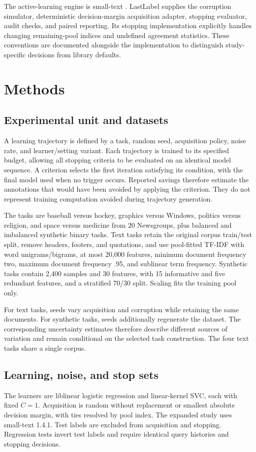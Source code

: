 \documentclass[10pt,twocolumn]{article}
\begin{document}
The active-learning engine is small-text \cite{smalltext}. LastLabel supplies the corruption simulator, deterministic decision-margin acquisition adapter, stopping evaluator, audit checks, and paired reporting. Its stopping implementation explicitly handles changing remaining-pool indices and undefined agreement statistics. These conventions are documented alongside the implementation to distinguish study-specific decisions from library defaults.

\section{Methods}
\subsection{Experimental unit and datasets}
A learning trajectory is defined by a task, random seed, acquisition policy, noise rate, and learner/setting variant. Each trajectory is trained to its specified budget, allowing all stopping criteria to be evaluated on an identical model sequence. A criterion selects the first iteration satisfying its condition, with the final model used when no trigger occurs. Reported savings therefore estimate the annotations that would have been avoided by applying the criterion. They do not represent training computation avoided during trajectory generation.

The tasks are baseball versus hockey, graphics versus Windows, politics versus religion, and space versus medicine from 20 Newsgroups, plus balanced and imbalanced synthetic binary tasks. Text tasks retain the original corpus train/test split, remove headers, footers, and quotations, and use pool-fitted TF-IDF with word unigrams/bigrams, at most 20,000 features, minimum document frequency two, maximum document frequency .95, and sublinear term frequency. Synthetic tasks contain 2,400 samples and 30 features, with 15 informative and five redundant features, and a stratified 70/30 split. Scaling fits the training pool only.

For text tasks, seeds vary acquisition and corruption while retaining the same documents. For synthetic tasks, seeds additionally regenerate the dataset. The corresponding uncertainty estimates therefore describe different sources of variation and remain conditional on the selected task construction. The four text tasks share a single corpus.

\subsection{Learning, noise, and stop sets}
The learners are liblinear logistic regression and linear-kernel SVC, each with fixed $C=1$. Acquisition is random without replacement or smallest absolute decision margin, with ties resolved by pool index. The expanded study uses small-text 1.4.1. Test labels are excluded from acquisition and stopping. Regression tests invert test labels and require identical query histories and stopping decisions.
\end{document}

